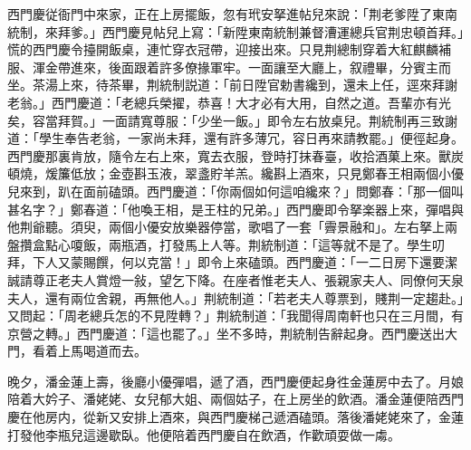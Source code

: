 西門慶従衙門中來家，正在上房擺飯，忽有玳安拏進帖兒來說：「荆老爹陞了東南統制，來拜爹。」西門慶見帖兒上寫：「新陞東南統制兼督漕運總兵官荆忠頓首拜。」慌的西門慶令擡開飯桌，連忙穿衣冠帶，迎接出來。只見荆總制穿着大紅麒麟補服、渾金帶進來，後面跟着許多僚掾軍牢。一面讓至大廳上，叙禮畢，分賓主而坐。茶湯上來，待茶畢，荆統制説道：「前日陞官勅書纔到，還未上任，逕來拜謝老翁。」西門慶道：「老總兵榮擢，恭喜！大才必有大用，自然之道。吾輩亦有光矣，容當拜賀。」一面請寬尊服：「少坐一飯。」即令左右放桌兒。荆統制再三致謝道：「學生奉告老翁，一家尚未拜，還有許多薄冗，容日再來請教罷。」便徑起身。西門慶那裏肯放，隨令左右上來，寬去衣服，登時打抹春臺，收拾酒菓上來。獸炭頓燒，煖簾低放；金壺斟玉液，翠盞貯羊羔。纔斟上酒來，只見鄭春王相兩個小優兒來到，趴在面前磕頭。西門慶道：「你兩個如何這咱纔來？」問鄭春：「那一個叫甚名字？」鄭春道：「他喚王相，是王柱的兄弟。」西門慶即令拏楽器上來，彈唱與他荆爺聽。須臾，兩個小優安放樂器停當，歌唱了一套「霽景融和」。左右拏上兩盤攢盒點心嗄飯，兩瓶酒，打發馬上人等。荆統制道：「這等就不是了。學生叨拜，下人又蒙賜饌，何以克當！」即令上來磕頭。西門慶道：「一二日房下還要潔誠請尊正老夫人賞燈一敍，望乞下降。在座者惟老夫人、張親家夫人、同僚何天泉夫人，還有兩位舍親，再無他人。」荆統制道：「若老夫人尊票到，賤荆一定趨赴。」又問起：「周老總兵怎的不見陞轉？」荆統制道：「我聞得周南軒也只在三月間，有京營之轉。」西門慶道：「這也罷了。」坐不多時，荆統制告辭起身。西門慶送出大門，看着上馬喝道而去。

晚夕，潘金蓮上壽，後廳小優彈唱，遞了酒，西門慶便起身徃金蓮房中去了。月娘陪着大妗子、潘姥姥、女兒郁大姐、兩個姑子，在上房坐的飲酒。潘金蓮便陪西門慶在他房内，從新又安排上酒來，與西門慶梯己遞酒磕頭。落後潘姥姥來了，金蓮打發他李瓶兒這邊歇臥。他便陪着西門慶自在飲酒，作歡頑耍做一䖏。

